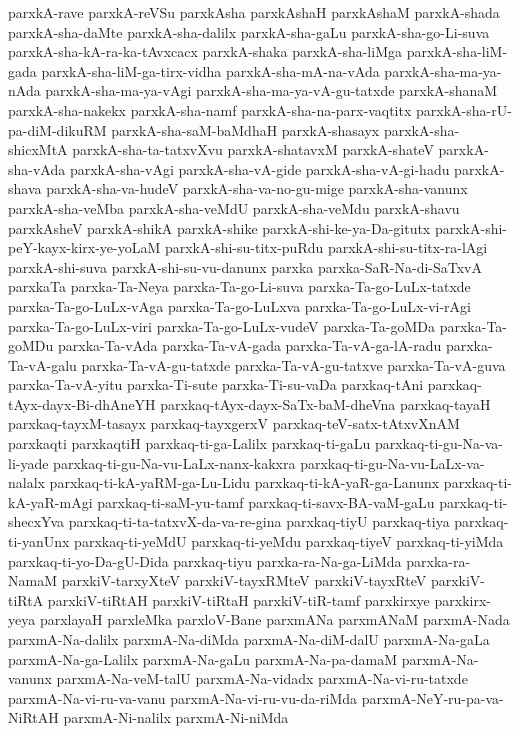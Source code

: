 {parxkA-rave
parxkA-reVSu
parxkAsha
parxkAshaH
parxkAshaM
parxkA-shada
parxkA-sha-daMte
parxkA-sha-dalilx
parxkA-sha-gaLu
parxkA-sha-go-Li-suva
parxkA-sha-kA-ra-ka-tAvxcacx
parxkA-shaka
parxkA-sha-liMga
parxkA-sha-liM-gada
parxkA-sha-liM-ga-tirx-vidha
parxkA-sha-mA-na-vAda
parxkA-sha-ma-ya-nAda
parxkA-sha-ma-ya-vAgi
parxkA-sha-ma-ya-vA-gu-tatxde
parxkA-shanaM
parxkA-sha-nakekx
parxkA-sha-namf
parxkA-sha-na-parx-vaqtitx
parxkA-sha-rU-pa-diM-dikuRM
parxkA-sha-saM-baMdhaH
parxkA-shasayx
parxkA-sha-shicxMtA
parxkA-sha-ta-tatxvXvu
parxkA-shatavxM
parxkA-shateV
parxkA-sha-vAda
parxkA-sha-vAgi
parxkA-sha-vA-gide
parxkA-sha-vA-gi-hadu
parxkA-shava
parxkA-sha-va-hudeV
parxkA-sha-va-no-gu-mige
parxkA-sha-vanunx
parxkA-sha-veMba
parxkA-sha-veMdU
parxkA-sha-veMdu
parxkA-shavu
parxkAsheV
parxkA-shikA
parxkA-shike
parxkA-shi-ke-ya-Da-gitutx
parxkA-shi-peY-kayx-kirx-ye-yoLaM
parxkA-shi-su-titx-puRdu
parxkA-shi-su-titx-ra-lAgi
parxkA-shi-suva
parxkA-shi-su-vu-danunx
parxka
parxka-SaR-Na-di-SaTxvA
parxkaTa
parxka-Ta-Neya
parxka-Ta-go-Li-suva
parxka-Ta-go-LuLx-tatxde
parxka-Ta-go-LuLx-vAga
parxka-Ta-go-LuLxva
parxka-Ta-go-LuLx-vi-rAgi
parxka-Ta-go-LuLx-viri
parxka-Ta-go-LuLx-vudeV
parxka-Ta-goMDa
parxka-Ta-goMDu
parxka-Ta-vAda
parxka-Ta-vA-gada
parxka-Ta-vA-ga-lA-radu
parxka-Ta-vA-galu
parxka-Ta-vA-gu-tatxde
parxka-Ta-vA-gu-tatxve
parxka-Ta-vA-guva
parxka-Ta-vA-yitu
parxka-Ti-sute
parxka-Ti-su-vaDa
parxkaq-tAni
parxkaq-tAyx-dayx-Bi-dhAneYH
parxkaq-tAyx-dayx-SaTx-baM-dheVna
parxkaq-tayaH
parxkaq-tayxM-tasayx
parxkaq-tayxgerxV
parxkaq-teV-satx-tAtxvXnAM
parxkaqti
parxkaqtiH
parxkaq-ti-ga-Lalilx
parxkaq-ti-gaLu
parxkaq-ti-gu-Na-va-li-yade
parxkaq-ti-gu-Na-vu-LaLx-nanx-kakxra
parxkaq-ti-gu-Na-vu-LaLx-va-nalalx
parxkaq-ti-kA-yaRM-ga-Lu-Lidu
parxkaq-ti-kA-yaR-ga-Lanunx
parxkaq-ti-kA-yaR-mAgi
parxkaq-ti-saM-yu-tamf
parxkaq-ti-savx-BA-vaM-gaLu
parxkaq-ti-shecxYva
parxkaq-ti-ta-tatxvX-da-va-re-gina
parxkaq-tiyU
parxkaq-tiya
parxkaq-ti-yanUnx
parxkaq-ti-yeMdU
parxkaq-ti-yeMdu
parxkaq-tiyeV
parxkaq-ti-yiMda
parxkaq-ti-yo-Da-gU-Dida
parxkaq-tiyu
parxka-ra-Na-ga-LiMda
parxka-ra-NamaM
parxkiV-tarxyXteV
parxkiV-tayxRMteV
parxkiV-tayxRteV
parxkiV-tiRtA
parxkiV-tiRtAH
parxkiV-tiRtaH
parxkiV-tiR-tamf
parxkirxye
parxkirx-yeya
parxlayaH
parxleMka
parxloV-Bane
parxmANa
parxmANaM
parxmA-Nada
parxmA-Na-dalilx
parxmA-Na-diMda
parxmA-Na-diM-dalU
parxmA-Na-gaLa
parxmA-Na-ga-Lalilx
parxmA-Na-gaLu
parxmA-Na-pa-damaM
parxmA-Na-vanunx
parxmA-Na-veM-talU
parxmA-Na-vidadx
parxmA-Na-vi-ru-tatxde
parxmA-Na-vi-ru-va-vanu
parxmA-Na-vi-ru-vu-da-riMda
parxmA-NeY-ru-pa-va-NiRtAH
parxmA-Ni-nalilx
parxmA-Ni-niMda
}
